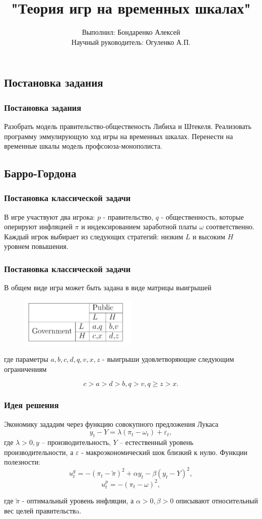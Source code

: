 \documentclass {beamer}
\title{ "Теория игр на временных шкалах"}
\author {Выполнил: Бондаренко Алексей \\Научный руководитель: Огуленко А.П.}
\date{}
\begin{document}
\begin{frame}
\maketitle
\end{frame}

\begin{frame}
\section{Постановка задания}
\frametitle{Постановка задания}
Разобрать модель правительство-общественость Либиха и Штекеля. Реализовать программу эммулирующую ход игры на временных шкалах. 
Перенести на временные шкалы модель профсоюза-монополиста. 
\end{frame}

\begin{frame}
	\section{Барро-Гордона}
\frametitle{Постановка классической задачи}
В игре участвуют два игрока: $p$ - правительство, $q$ - общественность, которые оперируют инфляцией $\pi$  и индексированием заработной платы $\omega$ соответственно. Каждый игрок выбирает из следующих стратегий: низким $L$  и высоким  $H$ уровнем повышения.
\end{frame}

\begin{frame}
\frametitle{Постановка классической задачи}
В общем виде игра может быть задана в виде матрицы выигрышей
\begin{figure}[h!]
	\centering
	\includegraphics[width=0.5\textwidth]{first}
\end{figure}
  где параметры $a,b,c,d,q,v,x,z$  - выигрыши удовлетворяющие следующим ограничениям

$$
c>a>d>b, q>v, q\ge z>x.
$$
\end{frame}

\begin{frame}
\frametitle{Идея решения}
Экономику зададим через функцию совокупного предложения Лукаса
$$y_t - Y = \lambda(\pi_t - \omega_t)+\varepsilon_t,$$
где  $\lambda>0, y$  – производительность, $Y$ – естественный уровень производительности, а  $\varepsilon$ - макроэкономический шок близкий к нулю.
Функции полезности: 
$$ u^g_t=-(\pi_t - \tilde{\pi})^2 + \alpha y_t - \beta(y_t-Y)^2,$$
$$ u^p_t=-(\pi_t - \omega)^2,$$

где $\tilde{\pi}$ - оптимальный уровень инфляции, а $\alpha > 0, \beta > 0$ описывают относительный вес целей правительствa.
\end{frame}
\end{document}

